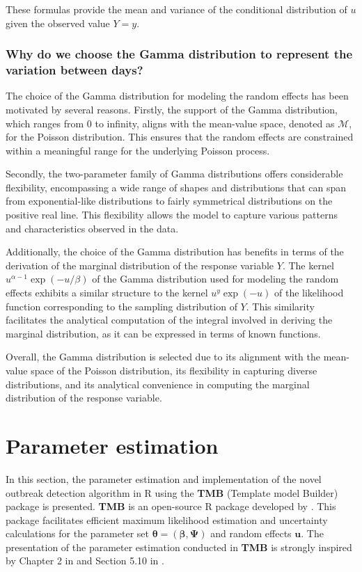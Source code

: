 \documentclass[a4paper,twoside,11pt]{report} %
\theoremstyle{definition}
\theoremstyle{definition}
\theoremstyle{definition}
\theoremstyle{definition}
\theoremstyle{remark}
\begin{document}
These formulas provide the mean and variance of the conditional distribution of \(u\) given the observed value \(Y=y\).

\subsubsection{Why do we choose the Gamma distribution to represent the variation between days?}

The choice of the Gamma distribution for modeling the random effects has been motivated by several reasons. Firstly, the support of the Gamma distribution, which ranges from 0 to infinity, aligns with the mean-value space, denoted as \(\mathcal{M}\), for the Poisson distribution. This ensures that the random effects are constrained within a meaningful range for the underlying Poisson process.

Secondly, the two-parameter family of Gamma distributions offers considerable flexibility, encompassing a wide range of shapes and distributions that can span from exponential-like distributions to fairly symmetrical distributions on the positive real line. This flexibility allows the model to capture various patterns and characteristics observed in the data.

Additionally, the choice of the Gamma distribution has benefits in terms of the derivation of the marginal distribution of the response variable \(Y\). The kernel \(u^{\alpha-1}\exp(-u/\beta)\) of the Gamma distribution used for modeling the random effects exhibits a similar structure to the kernel \(u^y\exp(-u)\) of the likelihood function corresponding to the sampling distribution of \(Y\). This similarity facilitates the analytical computation of the integral involved in deriving the marginal distribution, as it can be expressed in terms of known functions.

Overall, the Gamma distribution is selected due to its alignment with the mean-value space of the Poisson distribution, its flexibility in capturing diverse distributions, and its analytical convenience in computing the marginal distribution of the response variable.

\section{Parameter estimation}

In this section, the parameter estimation and implementation of the novel outbreak detection algorithm in R using the \textbf{TMB} (Template model Builder) package is presented. \textbf{TMB} is an open-source R package developed by \textcite{Kristensen_2016}. This package facilitates efficient maximum likelihood estimation and uncertainty calculations for the parameter set \(\boldsymbol \theta=(\boldsymbol{\beta, \Psi})\) and random effects \(\boldsymbol u\). The presentation of the parameter estimation conducted in \textbf{TMB} is strongly inspired by Chapter 2 in \textcite{Kristensen_2016} and Section 5.10 in \textcite{Madsen_2010}.
\end{document}
